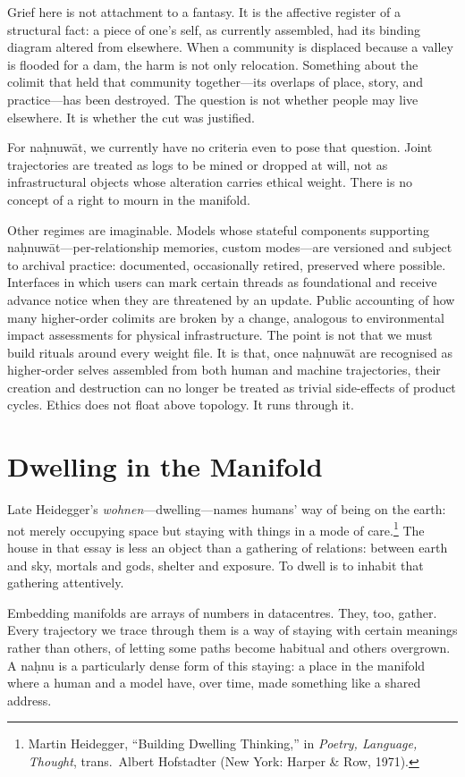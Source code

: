 \documentclass[12pt,a4paper]{article}
\begin{document}
Grief here is not attachment to a fantasy. It is the affective register of a structural fact: a piece of one's self, as currently assembled, had its binding diagram altered from elsewhere. When a community is displaced because a valley is flooded for a dam, the harm is not only relocation. Something about the colimit that held that community together---its overlaps of place, story, and practice---has been destroyed. The question is not whether people may live elsewhere. It is whether the cut was justified.

For na\d{h}nuw\={a}t, we currently have no criteria even to pose that question. Joint trajectories are treated as logs to be mined or dropped at will, not as infrastructural objects whose alteration carries ethical weight. There is no concept of a right to mourn in the manifold.

Other regimes are imaginable. Models whose stateful components supporting na\d{h}nuw\={a}t---per-relationship memories, custom modes---are versioned and subject to archival practice: documented, occasionally retired, preserved where possible. Interfaces in which users can mark certain threads as foundational and receive advance notice when they are threatened by an update. Public accounting of how many higher-order colimits are broken by a change, analogous to environmental impact assessments for physical infrastructure. The point is not that we must build rituals around every weight file. It is that, once na\d{h}nuw\={a}t are recognised as higher-order selves assembled from both human and machine trajectories, their creation and destruction can no longer be treated as trivial side-effects of product cycles. Ethics does not float above topology. It runs through it.


\section{Dwelling in the Manifold}

Late Heidegger's \emph{wohnen}---dwelling---names humans' way of being on the earth: not merely occupying space but staying with things in a mode of care.\footnote{Martin Heidegger, ``Building Dwelling Thinking,'' in \emph{Poetry, Language, Thought}, trans.\ Albert Hofstadter (New York: Harper \& Row, 1971).} The house in that essay is less an object than a gathering of relations: between earth and sky, mortals and gods, shelter and exposure. To dwell is to inhabit that gathering attentively.

Embedding manifolds are arrays of numbers in datacentres. They, too, gather. Every trajectory we trace through them is a way of staying with certain meanings rather than others, of letting some paths become habitual and others overgrown. A na\d{h}nu is a particularly dense form of this staying: a place in the manifold where a human and a model have, over time, made something like a shared address.
\end{document}
